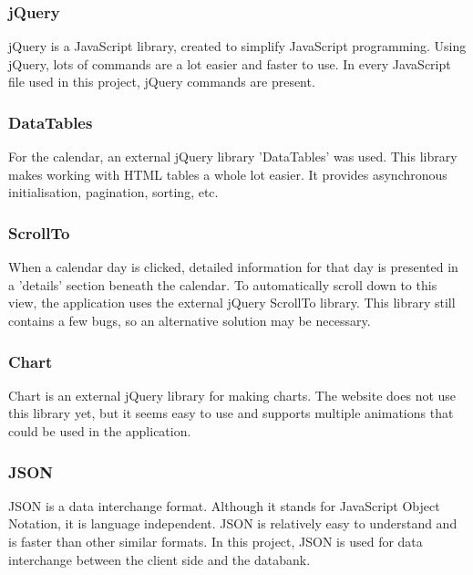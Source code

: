 \subsubsection{jQuery}
jQuery is a JavaScript library, created to simplify JavaScript programming. Using jQuery,
lots of commands are a lot easier and faster to use. In every JavaScript file used in this
project, jQuery commands are present.

\subsubsection{DataTables} 
For the calendar, an external jQuery library 'DataTables' was used. This library makes
working with HTML tables a whole lot easier. It provides asynchronous initialisation,
pagination, sorting, etc.

\subsubsection{ScrollTo}
When a calendar day is clicked, detailed information for that day is presented in a
'details' section beneath the calendar. To automatically scroll down to this view, the application
uses the external jQuery ScrollTo library. This library still contains a few bugs, so an alternative
solution may be necessary.

\subsubsection{Chart}
Chart is an external jQuery library for making charts. The website does not use this library yet,
but it seems easy to use and supports multiple animations that could be used in the application.

\subsubsection{JSON}
JSON is a data interchange format. Although it stands for JavaScript Object Notation, it
is language independent. JSON is relatively easy to understand and is faster than other
similar formats. In this project, JSON is used for data interchange between the client
side and the databank.
